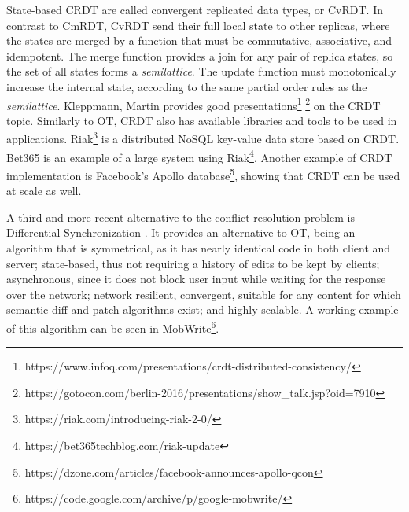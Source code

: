 State-based CRDT are called convergent replicated data types, or CvRDT. In contrast to CmRDT, CvRDT send their full local state to other replicas, where the states are merged by a function that must be commutative, associative, and idempotent. The merge function provides a join for any pair of replica states, so the set of all states forms a \textit{semilattice}. The update function must monotonically increase the internal state, according to the same partial order rules as the \textit{semilattice}. Kleppmann, Martin provides good presentations\footnote{https://www.infoq.com/presentations/crdt-distributed-consistency/} \footnote{https://gotocon.com/berlin-2016/presentations/show\_talk.jsp?oid=7910} on the CRDT topic. Similarly to OT, CRDT also has available libraries and tools to be used in applications. Riak\footnote{https://riak.com/introducing-riak-2-0/} is a distributed NoSQL key-value data store based on CRDT. Bet365 is an example of a large system using Riak\footnote{https://bet365techblog.com/riak-update}. Another example of CRDT implementation is Facebook's Apollo database\footnote{https://dzone.com/articles/facebook-announces-apollo-qcon}, showing that CRDT can be used at scale as well.

A third and more recent alternative to the conflict resolution problem is Differential Synchronization \cite{Fraser2009} \cite{Fraser-diff-sync-web}. It provides an alternative to OT, being an algorithm that is symmetrical, as it has nearly identical code in both client and server; state-based, thus not requiring a history of edits to be kept by clients; asynchronous, since it does not block user input while waiting for the response over the network; network resilient, convergent, suitable for any content for which semantic diff and patch algorithms exist; and highly scalable. A working example of this algorithm can be seen in MobWrite\footnote{https://code.google.com/archive/p/google-mobwrite/}.

